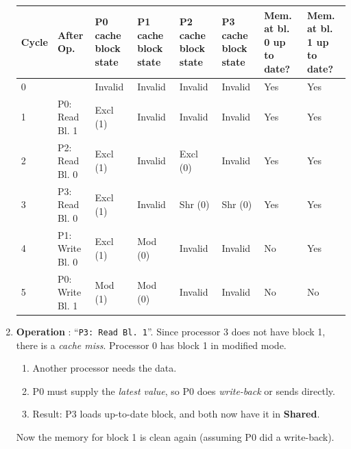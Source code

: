 \begin{enumerate}
    \begin{table}[!htp]
        \centering
        \begin{adjustbox}{width={\textwidth},totalheight={\textheight},keepaspectratio}
            \begin{tabular}{@{} l l p{4em} p{4em} p{4em} p{4em} p{3em} p{3em} @{}}
                \toprule
                \textbf{Cycle} & \textbf{After Op.} & \textbf{P0 cache block state} & \textbf{P1 cache block state} & \textbf{P2 cache block state} & \textbf{P3 cache block state} & \textbf{Mem. at bl. 0 up to date?} & \textbf{Mem. at bl. 1 up to date?} \\
                \midrule
                0   &                   & Invalid   & Invalid   & Invalid   & Invalid   & Yes   & Yes   \\ [.3em]
                1   & P0: Read Bl. 1    & Excl (1)  & Invalid   & Invalid   & Invalid   & Yes   & Yes   \\ [.3em]
                2   & P2: Read Bl. 0    & Excl (1)  & Invalid   & Excl (0)  & Invalid   & Yes   & Yes   \\ [.3em]
                3   & P3: Read Bl. 0    & Excl (1)  & Invalid   & Shr (0)   & Shr (0)   & Yes   & Yes   \\ [.3em]
                4   & P1: Write Bl. 0   & Excl (1)  & Mod (0)   & Invalid   & Invalid   & No    & Yes   \\ [.3em]
                5   & P0: Write Bl. 1   & Mod (1)   & Mod (0)   & Invalid   & Invalid   & No    & No   \\
                \bottomrule
            \end{tabular}
        \end{adjustbox}
    \end{table}


    \item \textbf{Operation \theenumi}: ``\texttt{P3: Read Bl. 1}''. Since processor 3 does not have block 1, there is a \emph{cache miss}. Processor 0 has block 1 in modified mode.
    \begin{enumerate}
        \item Another processor needs the data.
        \item P0 must supply the \emph{latest value}, so P0 does \emph{write-back} or sends directly.
        \item Result: P3 loads up-to-date block, and both now have it in \textbf{Shared}.
    \end{enumerate}
    Now the memory for block 1 is clean again (assuming P0 did a write-back).


\end{enumerate}
